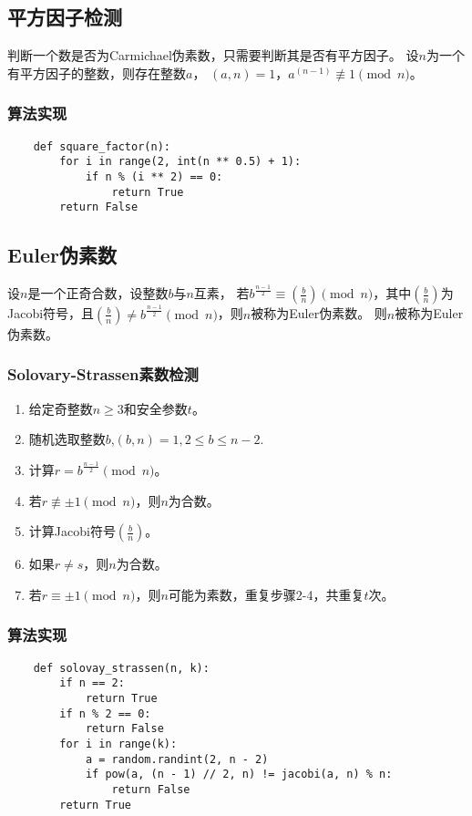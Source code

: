 \documentclass[a4paper]{article}
\begin{document}
\subsection{平方因子检测}
判断一个数是否为Carmichael伪素数，只需要判断其是否有平方因子。
设$n$为一个有平方因子的整数，则存在整数$a$，
$(a,n)=1$，$a^{(n-1)}\not \equiv 1\pmod n$。
\subsubsection{算法实现}
\begin{verbatim}
    def square_factor(n):
        for i in range(2, int(n ** 0.5) + 1):
            if n % (i ** 2) == 0:
                return True
        return False
\end{verbatim}
\subsection{Euler伪素数}
设$n$是一个正奇合数，设整数$b$与$n$互素，
若$b^{\frac{n-1}{2}}\equiv(\frac{b}{n})\pmod n$，其中$(\frac{b}{n})$为Jacobi符号，且$(\frac{b}{n})\neq b^{\frac{n-1}{2}}\pmod n$，则$n$被称为Euler伪素数。
则$n$被称为Euler伪素数。
\subsubsection{Solovary-Strassen素数检测}
\begin{enumerate}
    \item 给定奇整数$n\geq3$和安全参数$t$。
    \item 随机选取整数$b$,$(b,n)=1,2\leq b\leq n-2$.
    \item 计算$r=b^{\frac{n-1}{2}}\pmod n$。
    \item 若$r\not\equiv\pm1\pmod n$，则$n$为合数。
    \item 计算Jacobi符号$(\frac{b}{n})$。
    \item 如果$r\not=s $，则$n$为合数。
    \item 若$r\equiv\pm1\pmod n$，则$n$可能为素数，重复步骤2-4，共重复$t$次。
\end{enumerate}
\subsubsection{算法实现}
\begin{verbatim}
    def solovay_strassen(n, k):
        if n == 2:
            return True
        if n % 2 == 0:
            return False
        for i in range(k):
            a = random.randint(2, n - 2)
            if pow(a, (n - 1) // 2, n) != jacobi(a, n) % n:
                return False
        return True
\end{verbatim}
\end{document}
